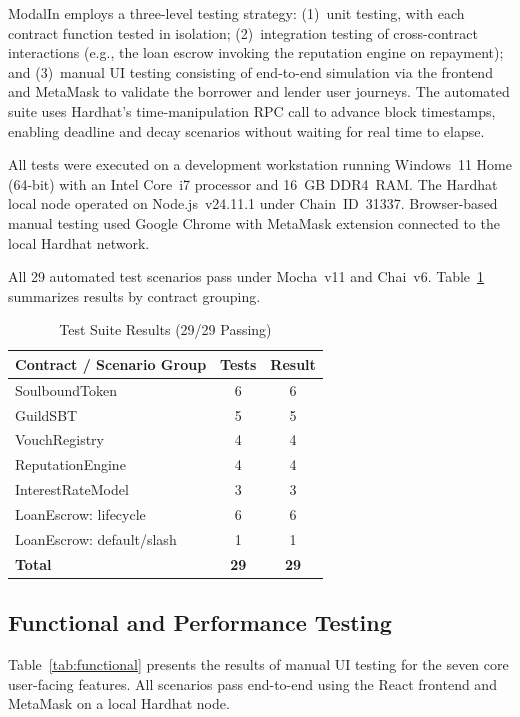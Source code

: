 \documentclass[conference]{IEEEtran}
\newcommand{\cmark}{\ding{51}}  %
\begin{document}
ModalIn employs a three-level testing strategy: (1)~unit testing, with each
contract function tested in isolation; (2)~integration testing of
cross-contract interactions (e.g., the loan escrow invoking the reputation
engine on repayment); and (3)~manual UI testing consisting of end-to-end
simulation via the frontend and MetaMask to validate the borrower and lender
user journeys.
The automated suite uses Hardhat's time-manipulation RPC call to advance
block timestamps, enabling deadline and decay scenarios without waiting for
real time to elapse.

All tests were executed on a development workstation running Windows~11
Home (64-bit) with an Intel Core~i7 processor and 16~GB DDR4~RAM.
The Hardhat local node operated on Node.js~v24.11.1 under Chain~ID~31337.
Browser-based manual testing used Google Chrome with MetaMask extension
connected to the local Hardhat network.

All 29 automated test scenarios pass under Mocha~v11 and Chai~v6.
Table~\ref{tab:tests} summarizes results by contract grouping.

\begin{table}[t]
\caption{Test Suite Results (29/29 Passing)}
\label{tab:tests}
\centering
\begin{tabular}{lcc}
\toprule
\textbf{Contract / Scenario Group} & \textbf{Tests} & \textbf{Result} \\
\midrule
SoulboundToken                & 6 & 6 \cmark \\
GuildSBT                      & 5 & 5 \cmark \\
VouchRegistry                 & 4 & 4 \cmark \\
ReputationEngine              & 4 & 4 \cmark \\
InterestRateModel             & 3 & 3 \cmark \\
LoanEscrow: lifecycle         & 6 & 6 \cmark \\
LoanEscrow: default/slash     & 1 & 1 \cmark \\
\midrule
\textbf{Total} & \textbf{29} & \textbf{29} \cmark \\
\bottomrule
\end{tabular}
\end{table}

\subsection{Functional and Performance Testing}

Table~\ref{tab:functional} presents the results of manual UI testing for the
seven core user-facing features. All scenarios pass end-to-end using the React
frontend and MetaMask on a local Hardhat node.
\end{document}
